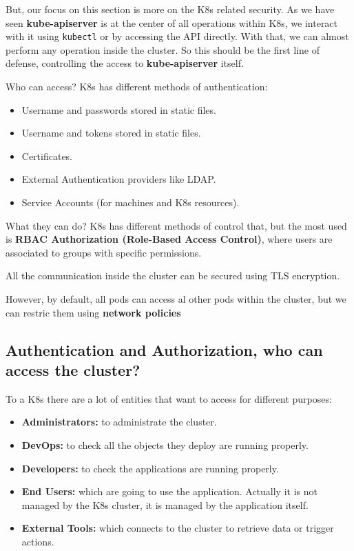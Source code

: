 \documentclass{article}
\begin{document}
But, our focus on this section is more on the K8s related security. As we have seen \textbf{kube-apiserver} is at the center
of all operations within K8s, we interact with it using \verb|kubectl| or by accessing the API directly. With that, we can almost perform any operation inside the cluster. So this should be the first line of defense, controlling the access to \textbf{kube-apiserver} itself.

Who can access? K8s has different methods of authentication:
\begin{itemize}
    \item Username and passwords stored in static files.
    \item Username and tokens stored in static files.
    \item Certificates.
    \item External Authentication providers like LDAP.
    \item Service Accounts (for machines and K8s resources).
\end{itemize}

What they can do? K8s has different methods of control that, but the most used is \textbf{RBAC Authorization (Role-Based Access Control)}, where users are associated to groups with specific permissions.

All the communication inside the cluster can be secured using TLS encryption.

However, by default, all pods can access al other pods within the cluster, but we can restric them using \textbf{network policies}

\subsection{Authentication and Authorization, who can access the cluster?}

To a K8s there are a lot of entities that want to access for different purposes:
\begin{itemize}
    \item \textbf{Administrators:} to administrate the cluster.
    \item \textbf{DevOps:} to check all the objects they deploy are running properly.
    \item \textbf{Developers:} to check the applications are running properly.
    \item \textbf{End Users:} which are going to use the application. Actually it is not managed by the K8s cluster, it is managed by the application itself.
    \item \textbf{External Tools:} which connects to the cluster to retrieve data or trigger actions.
\end{itemize}
\end{document}
